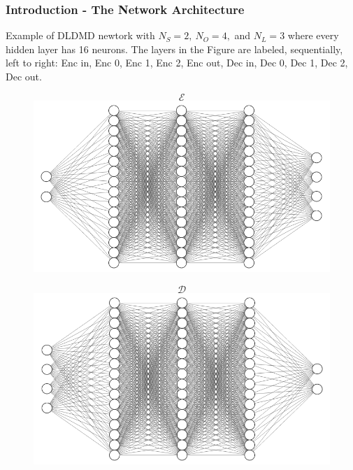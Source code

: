 \documentclass[11pt,aspectratio=169]{beamer}
\begin{document}
    \begin{frame}
        \frametitle{Introduction - The Network Architecture}
        Example of DLDMD newtork with $N_S = 2,\ N_O = 4,$ and $N_L = 3$ where every
        hidden layer has 16 neurons. The layers in the Figure are 
        labeled, sequentially, left to right: Enc in, Enc 0, Enc 1, Enc 2, Enc out, Dec in, 
        Dec 0, Dec 1, Dec 2, Dec out.
        \begin{figure}
            \centering
            \begin{minipage}{.5\textwidth}
                $$\mathcal{E}$$
                \includegraphics[width=\textwidth]{../Figures/Encoder.png}
            \end{minipage}%
            \begin{minipage}{.5\textwidth}
                $$\mathcal{D}$$
                \includegraphics[width=\textwidth]{../Figures/Decoder.png}
            \end{minipage}
        \end{figure}
    \end{frame}
\end{document}
